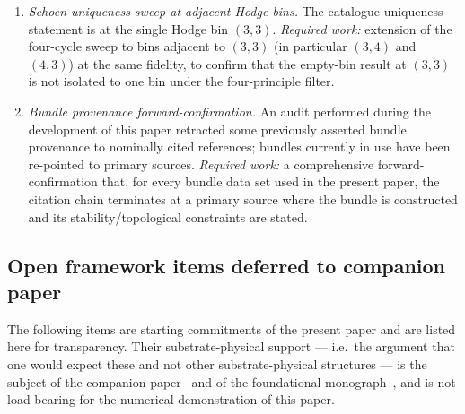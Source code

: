 ﻿\documentclass[reprint,amsmath,amssymb,aps,prd,longbibliography,floatfix]{revtex4-2}
\begin{document}
\begin{enumerate}
\item \emph{Schoen-uniqueness sweep at adjacent Hodge bins.} The
catalogue uniqueness statement is at the single Hodge bin $(3,3)$.
\emph{Required work:} extension of the four-cycle sweep to bins
adjacent to $(3,3)$ (in particular $(3,4)$ and $(4,3)$) at the same
fidelity, to confirm that the empty-bin result at $(3,3)$ is not
isolated to one bin under the four-principle filter.

\item \emph{Bundle provenance forward-confirmation.} An audit
performed during the development of this paper retracted some
previously asserted bundle provenance to nominally cited
references; bundles currently in use have been re-pointed to
primary sources. \emph{Required work:} a comprehensive
forward-confirmation that, for every bundle data set used in the
present paper, the citation chain terminates at a primary source
where the bundle is constructed and its stability/topological
constraints are stated.
\end{enumerate}

\subsection{Open framework items deferred to companion paper}
\label{subsec:open-framework}

The following items are starting commitments of the present paper and
are listed here for transparency. Their substrate-physical support
--- i.e.\ the argument that one would expect these and not other
substrate-physical structures --- is the subject of the companion
paper~\cite{UnreasonableEffectiveness} and of the foundational
monograph~\cite{ExistBook}, and is not load-bearing for the numerical
demonstration of this paper.
\end{document}
